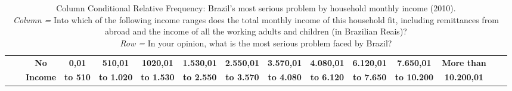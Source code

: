 \documentclass[12pt,a4paper]{article}
\begin{document}

\begin{sidewaystable}
\centering
\caption[caption]{Column Conditional Relative Frequency: Brazil's most serious problem by household monthly income (2010). \\\hspace{\textwidth} \textit{Column =} Into which of the following income ranges does the total monthly income of this household fit, including remittances from abroad and the income of all the working adults and children (in Brazilian Reais)? \\\hspace{\textwidth} \textit{Row =} In your opinion, what is the most serious problem faced by Brazil?}
\scriptsize
{}
\begin{tabular}{cl *{13}{c} }\\
\toprule
\cmidrule(l{.75em}){2-12} 
&&\textbf{No}&\textbf{0,01}&\textbf{510,01}&\textbf{1020,01}&\textbf{ 1.530,01}&\textbf{2.550,01}&\textbf{3.570,01}&\textbf{4.080,01}&\textbf{6.120,01}&\textbf{7.650,01}&\textbf{More than}\\

&&\textbf{Income}&\textbf{to 510}&\textbf{to 1.020}&\textbf{to 1.530}&\textbf{to 2.550}&\textbf{to 3.570}&\textbf{to 4.080}&\textbf{to 6.120}&\textbf{to 7.650}&\textbf{to 10.200}&\textbf{10.200,01} \\


\cmidrule(l{.75em}){3-3}\cmidrule(l{.75em}){4-4}\cmidrule(l{.75em}){5-5}\cmidrule(l{.75em}){6-6}\cmidrule(l{.75em}){7-7}\cmidrule(l{.75em}){8-8}\cmidrule(l{.75em}){9-9}\cmidrule(l{.75em}){10-10}\cmidrule(l{.75em}){11-11}\cmidrule(l{.75em}){12-12}\cmidrule(l{.75em}){13-13}



\end{tabular}
\end{sidewaystable}
\end{document}
